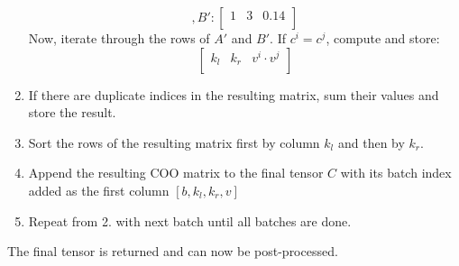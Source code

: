 \begin{enumerate}[label*=\arabic*.]
\begin{equation*}
              , B':
              \begin{bmatrix}
                  1 & 3 & 0.14 \\
              \end{bmatrix}
          \end{equation*}
          Now, iterate through the rows of $A'$ and $B'$. If $c^i = c^j$, compute and store:
          \begin{equation*}
              \begin{bmatrix}
                  k_l & k_r & v^i \cdot v^j \\
              \end{bmatrix}
          \end{equation*}
    \item If there are duplicate indices in the resulting matrix, sum their values and store the result.
    \item Sort the rows of the resulting matrix first by column $k_l$ and then by $k_r$.
    \item Append the resulting COO matrix to the final tensor $C$ with its batch index added as the
          first column $[b, k_l, k_r, v]$
    \item Repeat from 2. with next batch until all batches are done.
\end{enumerate}
The final tensor is returned and can now be post-processed.

